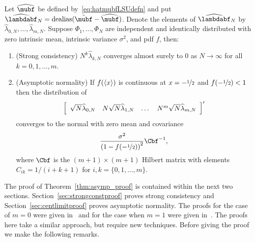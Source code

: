 \documentclass[journal]{IEEEtran}
\begin{document}

 
\begin{theorem} \label{thm:asymp_proof} 
Let $\widehat{\mubf}$ be defined by~\eqref{eq:hatmubfLSUdefn} and put $\widehat{\lambdabf}_N = \dealias(\tilde{\mubf} - \widehat{\mubf})$.  Denote the elements of $\widehat{\lambdabf}_N$ by $\widehat{\lambda}_{0,N}, \dots, \widehat{\lambda}_{m,N}$.  Suppose $\Phi_1, \dots, \Phi_N$ are independent and identically distributed with zero intrinsic mean, intrinsic variance $\sigma^2$, and pdf $f$, then: 
\begin{enumerate}
\item (Strong consistency) $N^k \widehat{\lambda}_{k,N}$ converges almost surely to $0$ as $N\rightarrow\infty$ for all $k = 0, 1, \dots, m$.
\item (Asymptotic normality) If $f(\left\langle x \right\rangle)$ is continuous at $x = -\nicefrac{1}{2}$ and $f(-\nicefrac{1}{2}) < 1$ then the distribution of
\[
\left[
\begin{array}
[c]{cccc}%
\sqrt{N} \widehat{\lambda}_{0,N} & N \sqrt{N}\widehat{\lambda}_{1,N}  & \dots & N^m\sqrt{N} \widehat{\lambda}_{m,N}
\end{array}
\right]^\prime
\]
converges to the normal with zero mean and covariance
\[
\frac{\sigma^2}{\left(1-f( -\nicefrac{1}{2}) \right)^{2}} \Cbf^{-1},
\]
where $\Cbf$ is the $(m+1)\times (m+1)$ Hilbert matrix with elements $C_{ik} = 1/(i + k + 1)$ for $i,k = \{0, 1, \dots, m\}$.
\end{enumerate}
\end{theorem}
The proof of Theorem~\ref{thm:asymp_proof} is contained within the next two sections. Section~\ref{sec:strongconstproof} proves strong consistency and Section~\ref{sec:centlimitproof} proves asymptotic normality.  The proofs for the case of $m=0$ were given in~\cite{McKilliam_mean_dir_est_sq_arc_length2010} and for the case when $m=1$ were given in~\cite{McKilliamFrequencyEstimationByPhaseUnwrapping2009}.  The proofs here take a similar approach, but require new techniques.  Before giving the proof we make the following remarks.
\end{document}
